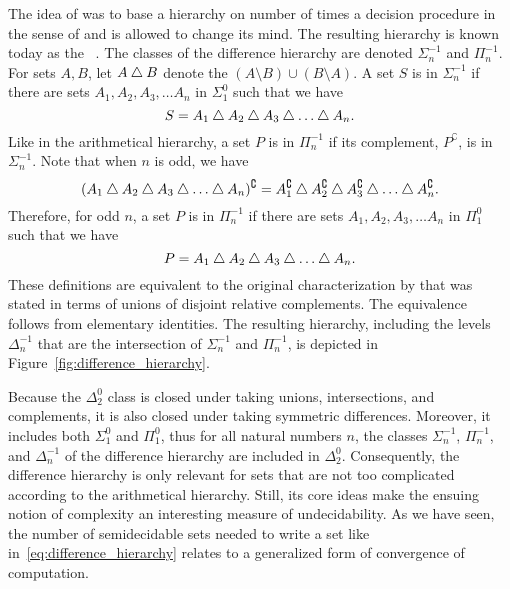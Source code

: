The idea of \citeauthor{ershov1968hierarchyi} was to base a hierarchy on number of times a decision procedure in the sense of \citeauthor{putnam1965trial} and \citeauthor{gold1965limiting} is allowed to change its mind.
The resulting hierarchy is known today as the ~\parencite{downey2010algorithmic}.
The classes of the difference hierarchy are denoted $\Sigma^{-1}_n$ and $\Pi^{-1}_n$.
For sets $A, B$, let $A \bigtriangleup B$ denote the  $(A \setminus B) \cup (B \setminus A)$.
A set $S$ is in $\Sigma^{-1}_n$ if there are sets $A_1, A_2, A_3, \ldots A_n$ in $\Sigma^0_1$ such that we have
\begin{equation}
\label{eq:difference_hierarchy}
  S = A_1 \bigtriangleup A_2 \bigtriangleup A_3 \bigtriangleup \ldots \bigtriangleup A_n.
\end{equation}
Like in the arithmetical hierarchy, a set $P$ is in $\Pi^{-1}_n$ if its complement, $P^\complement$, is in~$\Sigma^{-1}_n$.
Note that when $n$ is odd, we have
\begin{equation*}
  (A_1 \bigtriangleup A_2 \bigtriangleup A_3 \bigtriangleup \ldots \bigtriangleup A_n)^\complement = A_1^\complement \bigtriangleup A_2^\complement \bigtriangleup A_3^\complement \bigtriangleup \ldots \bigtriangleup A_n^\complement.
\end{equation*}
Therefore, for odd $n$, a set $P$ is in $\Pi^{-1}_n$ if there are sets $A_1, A_2, A_3, \ldots A_n$ in $\Pi^0_1$ such that we have
\begin{equation*}
  P = A_1 \bigtriangleup A_2 \bigtriangleup A_3 \bigtriangleup \ldots \bigtriangleup A_n.
\end{equation*}
These definitions are equivalent to the original characterization by \textcite{ershov1968hierarchyi} that was stated in terms of unions of disjoint relative complements.
The equivalence follows from elementary identities.
The resulting hierarchy, including the levels~$\Delta^{-1}_n$ that are the intersection of $\Sigma^{-1}_n$ and $\Pi^{-1}_n$, is depicted in Figure~\ref{fig:difference_hierarchy}.

Because the $\Delta^0_2$ class is closed under taking unions, intersections, and complements, it is also closed under taking symmetric differences.
Moreover, it includes both $\Sigma^0_1$ and $\Pi^0_1$, thus for all natural numbers $n$, the classes $\Sigma^{-1}_n$, $\Pi^{-1}_n$, and $\Delta^{-1}_n$ of the difference hierarchy are included in $\Delta^0_2$.
Consequently, the difference hierarchy is only relevant for sets that are not too complicated according to the arithmetical hierarchy.
Still, its core ideas make the ensuing notion of complexity an interesting measure of undecidability.
As we have seen, the number of semidecidable sets needed to write a set like in~\eqref{eq:difference_hierarchy} relates to a generalized form of convergence of computation.

